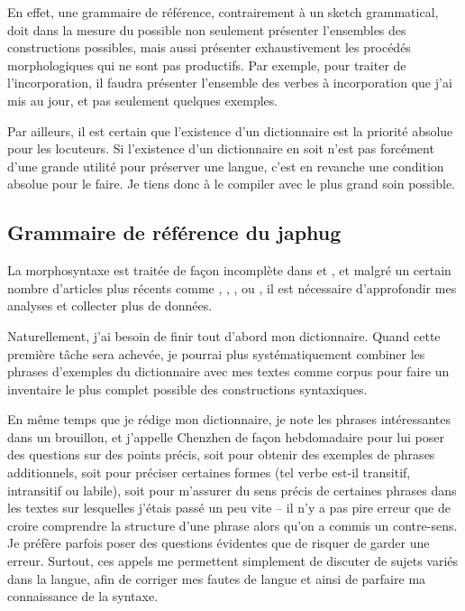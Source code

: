\documentclass[oldfontcommands,oneside,a4paper,11pt]{memoir}
\begin{document}
	En effet, une grammaire de référence, contrairement à un sketch grammatical, doit dans la mesure du possible non seulement présenter l'ensembles des constructions possibles, mais aussi présenter exhaustivement les procédés morphologiques qui ne sont pas productifs. Par exemple, pour traiter de l'incorporation, il faudra présenter l'ensemble des verbes à incorporation que j'ai mis au jour, et pas seulement quelques exemples. 
	
	Par ailleurs, il est certain que l'existence d'un dictionnaire est la priorité absolue pour les locuteurs. Si l'existence d'un dictionnaire en soit n'est pas forcément d'une grande utilité pour préserver une langue, c'est en revanche une condition absolue pour le faire. Je tiens donc à le compiler avec le plus grand soin possible.  
	
 
	
	
\subsection{Grammaire de référence du japhug}	 \label{grammaire}
La morphosyntaxe est traitée de façon incomplète dans \citet{jacques04these} et \citet{jacques08}, et malgré un certain nombre d'articles plus récents comme \citet{jacques10inverse}, \citet{jacques12incorp}, \citet{jacques12demotion},    \citet{jacques13harmonization} ou \citet{jacques14antipassive}, il est nécessaire d'approfondir mes analyses et collecter plus de données.

Naturellement, j'ai besoin de finir tout d'abord mon dictionnaire. Quand cette première tâche sera achevée, je pourrai plus systématiquement combiner les phrases d'exemples du dictionnaire avec mes textes comme corpus pour faire un inventaire le plus complet possible des constructions syntaxiques.  

En même temps que je rédige mon dictionnaire, je note les phrases intéressantes dans un brouillon, et j'appelle Chenzhen de façon hebdomadaire pour lui poser des questions sur des points précis, soit pour obtenir des exemples de phrases additionnels, soit pour préciser certaines formes (tel verbe est-il transitif, intransitif ou labile), soit pour m'assurer du sens précis de certaines phrases dans les textes sur lesquelles j'étais passé un peu vite -- il n'y a pas pire erreur que de croire comprendre la structure d'une phrase alors qu'on a commis un contre-sens. Je préfère parfois poser des questions évidentes que de risquer de garder une erreur. Surtout, ces appels me permettent simplement de discuter de sujets variés dans la langue, afin de corriger mes fautes de langue et ainsi de parfaire ma connaissance de la syntaxe.
\end{document}
